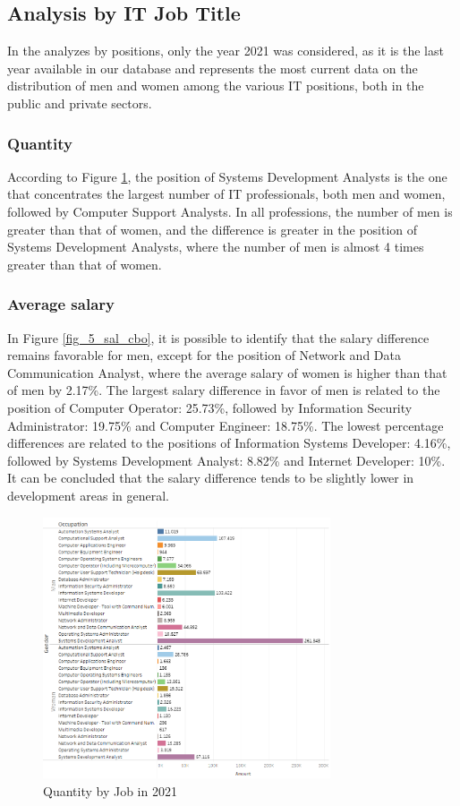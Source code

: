 \subsection{Analysis by IT Job Title}

In the analyzes by positions, only the year 2021 was considered, as it is the last year available in our database and represents the most current data on the distribution of men and women among the various IT positions, both in the public and private sectors.

\subsubsection{Quantity}

According to Figure \ref{fig_5_qnt_cbo}, the position of Systems Development Analysts is the one that concentrates the largest number of IT professionals, both men and women, followed by Computer Support Analysts. In all professions, the number of men is greater than that of women, and the difference is greater in the position of Systems Development Analysts, where the number of men is almost 4 times greater than that of women.

\subsubsection{Average salary}

In Figure \ref{fig_5_sal_cbo}, it is possible to identify that the salary difference remains favorable for men, except for the position of Network and Data Communication Analyst, where the average salary of women is higher than that of men by 2.17\%. The largest salary difference in favor of men is related to the position of Computer Operator: 25.73\%, followed by Information Security Administrator: 19.75\% and Computer Engineer: 18.75\%. The lowest percentage differences are related to the positions of Information Systems Developer: 4.16\%, followed by Systems Development Analyst: 8.82\% and Internet Developer: 10\%. It can be concluded that the salary difference tends to be slightly lower in development areas in general.

\begin{figure}[htbp]
	\centerline{
		\includegraphics[width=85mm]{assets/5_qnt_cbo.PNG}
	}
	\caption{Quantity by Job in 2021}
	\label{fig_5_qnt_cbo}
\end{figure}

